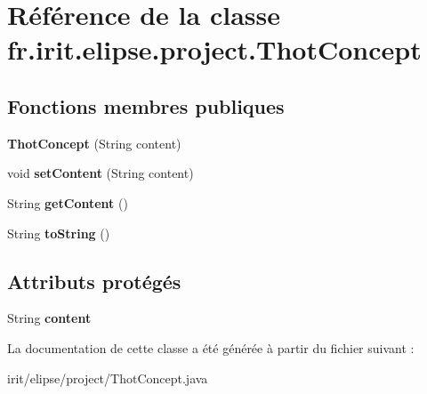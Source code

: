 \hypertarget{classfr_1_1irit_1_1elipse_1_1project_1_1_thot_concept}{}\section{Référence de la classe fr.\+irit.\+elipse.\+project.\+Thot\+Concept}
\label{classfr_1_1irit_1_1elipse_1_1project_1_1_thot_concept}
\subsection*{Fonctions membres publiques}
\begin{DoxyCompactItemize}
\item 
\mbox{\label{classfr_1_1irit_1_1elipse_1_1project_1_1_thot_concept_af49e1d1f0bb3bc04e86dd9afa0a8acd4}} 
{\bfseries Thot\+Concept} (String content)
\item 
\mbox{\label{classfr_1_1irit_1_1elipse_1_1project_1_1_thot_concept_a7d25d2e2ca2e9c77dd30b4488dd63b0f}} 
void {\bfseries set\+Content} (String content)
\item 
\mbox{\label{classfr_1_1irit_1_1elipse_1_1project_1_1_thot_concept_a6d4d33b332aea9d05e2fa07fa690589f}} 
String {\bfseries get\+Content} ()
\item 
\mbox{\label{classfr_1_1irit_1_1elipse_1_1project_1_1_thot_concept_aeff638c51b2f2d3d84319e569f5b6b7b}} 
String {\bfseries to\+String} ()
\end{DoxyCompactItemize}
\subsection*{Attributs protégés}
\begin{DoxyCompactItemize}
\item 
\mbox{\label{classfr_1_1irit_1_1elipse_1_1project_1_1_thot_concept_a8bbda506fde33f402c00f18b3d495d63}} 
String {\bfseries content}
\end{DoxyCompactItemize}


La documentation de cette classe a été générée à partir du fichier suivant \+:\begin{DoxyCompactItemize}
\item 
irit/elipse/project/Thot\+Concept.\+java\end{DoxyCompactItemize}
